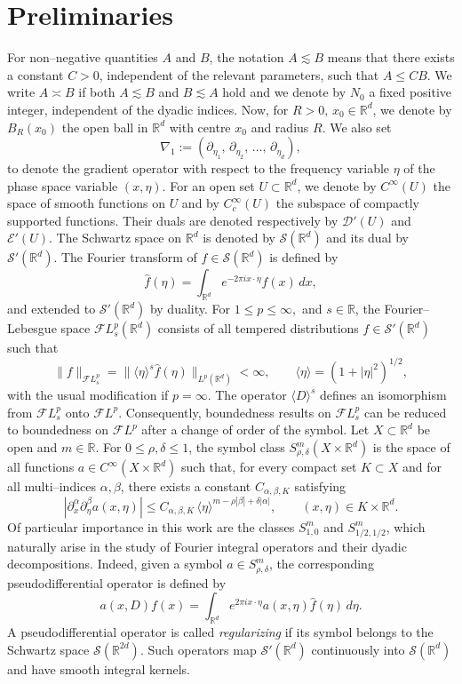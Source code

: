\documentclass[12pt, reqno]{amsart}
\theoremstyle{definition}
\theoremstyle{remark}
\numberwithin{equation}{section}
\begin{document}
\section{Preliminaries}\label{Preliminaries}

For non–negative quantities $A$ and $B$, the notation $A\lesssim B$ means that
there exists a constant $C>0$, independent of the relevant parameters, such that
$A\le CB$.  
We write $A\asymp B$ if both $A\lesssim B$ and $B\lesssim A$ hold and we denote by $N_0$ a fixed positive integer, independent of the dyadic indices. Now, for $R>0, \,x_0\in \mathbb{R}^d$, we denote by $B_R(x_0)$ the open ball in $\mathbb{R}^d$ with centre $x_0$ and radius $R$. We also set 
\[
\nabla_1 := (\partial_{\eta_1},\,\partial_{\eta_2},\,\ldots,\,\partial_{\eta_d}),\]  to denote the gradient operator with respect to the frequency variable $\eta$ of the phase space variable $(x,\eta).$  For an open set $U\subset\mathbb{R}^{d}$, we denote by $C^\infty(U)$ the space of
smooth functions on $U$ and by $C_c^\infty(U)$ the subspace of compactly supported
functions. Their duals are denoted respectively by $\mathcal{D}'(U)$ and
$\mathcal{E}'(U)$.  
The Schwartz space on $\mathbb{R}^d$ is denoted by $\mathcal{S}(\mathbb{R}^d)$ and
its dual by $\mathcal{S}'(\mathbb{R}^d)$. The Fourier transform of $f\in\mathcal{S}(\mathbb{R}^d)$ is defined by
\[
\widehat{f}(\eta)=\int_{\mathbb{R}^d} e^{-2\pi i x\cdot\eta} f(x)\,dx,
\]
and extended to $\mathcal{S}'(\mathbb{R}^d)$ by duality.
For $1\le p\le\infty,$ and $s\in\mathbb{R}$, the Fourier--Lebesgue space
$\mathcal{F}L^p_s(\mathbb{R}^d)$ consists of all tempered distributions
$f\in\mathcal{S}'(\mathbb{R}^d)$ such that
\[
\|f\|_{\mathcal{F}L^p_s}
=
\|\langle\eta\rangle^s \widehat{f}(\eta)\|_{L^p(\mathbb{R}^d)}<\infty,
\qquad
\langle\eta\rangle=(1+|\eta|^2)^{1/2},
\]
with the usual modification if $p=\infty$. The operator $\langle D\rangle^s$ defines an isomorphism from
$\mathcal{F}L^p_s$ onto $\mathcal{F}L^p$. Consequently, boundedness results on
$\mathcal{F}L^p_s$ can be reduced to boundedness on $\mathcal{F}L^p$ after a
change of order of the symbol. Let $X\subset\mathbb{R}^d$ be open and $m\in\mathbb{R}$.  
For $0\le\rho,\delta\le1$, the symbol class $S^m_{\rho,\delta}(X\times\mathbb{R}^d)$
is the space of all functions $a\in C^\infty(X\times\mathbb{R}^d)$ such that, for
every compact set $K\subset X$ and for all multi–indices $\alpha,\beta$, there
exists a constant $C_{\alpha,\beta,K}$ satisfying
\[
|\partial_x^\alpha\partial_\eta^\beta a(x,\eta)|
\le C_{\alpha,\beta,K}\,
\langle\eta\rangle^{m-\rho|\beta|+\delta|\alpha|},
\qquad (x,\eta)\in K\times\mathbb{R}^d.
\]
Of particular importance in this work are the classes $S^m_{1,0}$ and
$S^m_{1/2,1/2}$, which naturally arise in the study of Fourier integral operators
and their dyadic decompositions. Indeed, given a symbol $a\in S^m_{\rho,\delta}$, the corresponding pseudodifferential
operator is defined by
\[
a(x,D)f(x)
=
\int_{\mathbb{R}^d} e^{2\pi i x\cdot\eta} a(x,\eta)\widehat{f}(\eta)\,d\eta.
\]
A pseudodifferential operator is called \emph{regularizing} if its symbol belongs
to the Schwartz space $\mathcal{S}(\mathbb{R}^{2d})$. Such operators map
$\mathcal{S}'(\mathbb{R}^d)$ continuously into $\mathcal{S}(\mathbb{R}^d)$ and have
smooth integral kernels.
\end{document}
